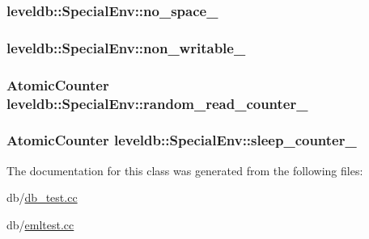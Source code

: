 \subsubsection[{no\+\_\+space\+\_\+}]{ leveldb\+::\+Special\+Env\+::no\+\_\+space\+\_\+}\label{classleveldb_1_1_special_env_a21c9400bf22bd43f75349677b4d3413b}
\hypertarget{classleveldb_1_1_special_env_a3ecf4339c101366198febb32cfe938f0}{}
\subsubsection[{non\+\_\+writable\+\_\+}]{ leveldb\+::\+Special\+Env\+::non\+\_\+writable\+\_\+}\label{classleveldb_1_1_special_env_a3ecf4339c101366198febb32cfe938f0}
\hypertarget{classleveldb_1_1_special_env_a7cf0b2e4dcd63460e8776ae3a2c70bee}{}
\subsubsection[{random\+\_\+read\+\_\+counter\+\_\+}]{\setlength{\rightskip}{0pt plus 5cm}Atomic\+Counter leveldb\+::\+Special\+Env\+::random\+\_\+read\+\_\+counter\+\_\+}\label{classleveldb_1_1_special_env_a7cf0b2e4dcd63460e8776ae3a2c70bee}
\hypertarget{classleveldb_1_1_special_env_abb5c524c3a6f106ec564c09301fc7b63}{}
\subsubsection[{sleep\+\_\+counter\+\_\+}]{\setlength{\rightskip}{0pt plus 5cm}Atomic\+Counter leveldb\+::\+Special\+Env\+::sleep\+\_\+counter\+\_\+}\label{classleveldb_1_1_special_env_abb5c524c3a6f106ec564c09301fc7b63}


The documentation for this class was generated from the following files\+:\begin{DoxyCompactItemize}
\item 
db/\hyperlink{db__test_8cc}{db\+\_\+test.\+cc}\item 
db/\hyperlink{emltest_8cc}{emltest.\+cc}\end{DoxyCompactItemize}
